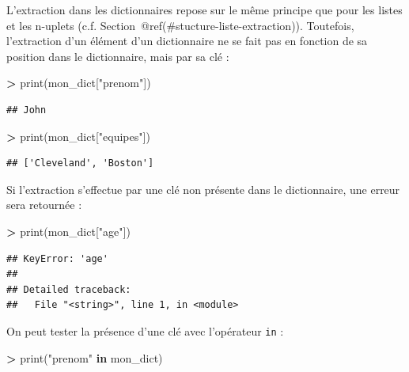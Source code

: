 \documentclass[12pt,]{book}
\newenvironment{Shaded}{\begin{snugshade}}{\end{snugshade}}
\newcommand{\KeywordTok}[1]{\textcolor[rgb]{0.13,0.29,0.53}{\textbf{#1}}}
\newcommand{\StringTok}[1]{\textcolor[rgb]{0.31,0.60,0.02}{#1}}
\newcommand{\OperatorTok}[1]{\textcolor[rgb]{0.81,0.36,0.00}{\textbf{#1}}}
\newcommand{\BuiltInTok}[1]{#1}
\newcommand{\NormalTok}[1]{#1}
\numberwithin{equation}{section}
\numberwithin{countremarque}{section}
\begin{document}
L'extraction dans les dictionnaires repose sur le même principe que pour
les listes et les n-uplets (c.f.
Section~@ref(\#stucture-liste-extraction)). Toutefois, l'extraction d'un
élément d'un dictionnaire ne se fait pas en fonction de sa position dans
le dictionnaire, mais par sa clé :

\begin{Shaded}
\begin{Highlighting}[]
\OperatorTok{>} \BuiltInTok{print}\NormalTok{(mon_dict[}\StringTok{"prenom"}\NormalTok{])}
\end{Highlighting}
\end{Shaded}

\begin{lstlisting}
## John
\end{lstlisting}

\begin{Shaded}
\begin{Highlighting}[]
\OperatorTok{>} \BuiltInTok{print}\NormalTok{(mon_dict[}\StringTok{"equipes"}\NormalTok{])}
\end{Highlighting}
\end{Shaded}

\begin{lstlisting}
## ['Cleveland', 'Boston']
\end{lstlisting}

Si l'extraction s'effectue par une clé non présente dans le
dictionnaire, une erreur sera retournée :

\begin{Shaded}
\begin{Highlighting}[]
\OperatorTok{>} \BuiltInTok{print}\NormalTok{(mon_dict[}\StringTok{"age"}\NormalTok{])}
\end{Highlighting}
\end{Shaded}

\begin{lstlisting}
## KeyError: 'age'
## 
## Detailed traceback: 
##   File "<string>", line 1, in <module>
\end{lstlisting}

On peut tester la présence d'une clé avec l'opérateur \texttt{in} :

\begin{Shaded}
\begin{Highlighting}[]
\OperatorTok{>} \BuiltInTok{print}\NormalTok{(}\StringTok{"prenom"} \KeywordTok{in}\NormalTok{ mon_dict)}
\end{Highlighting}
\end{Shaded}
\end{document}
